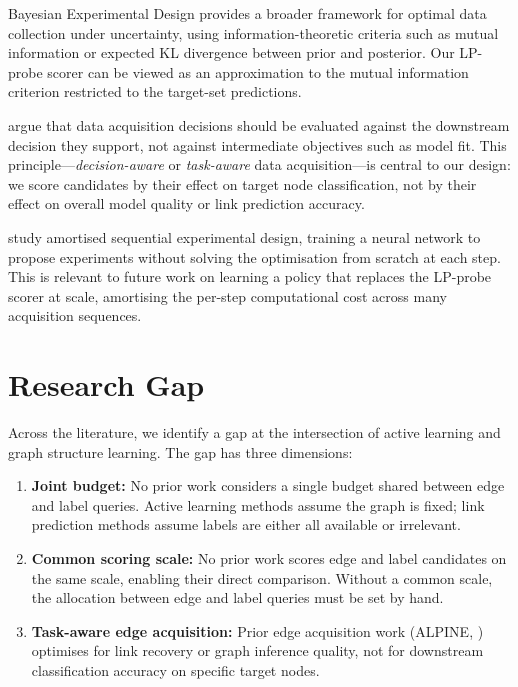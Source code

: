 \documentclass[12pt,a4paper,oneside]{report}
\begin{document}
Bayesian Experimental Design \citep{bed} provides a broader framework for optimal data collection under uncertainty, using information-theoretic criteria such as mutual information or expected KL divergence between prior and posterior. Our LP-probe scorer can be viewed as an approximation to the mutual information criterion restricted to the target-set predictions.

\citet{wilder} argue that data acquisition decisions should be evaluated against the downstream decision they support, not against intermediate objectives such as model fit. This principle---\emph{decision-aware} or \emph{task-aware} data acquisition---is central to our design: we score candidates by their effect on target node classification, not by their effect on overall model quality or link prediction accuracy.

\citet{foster} study amortised sequential experimental design, training a neural network to propose experiments without solving the optimisation from scratch at each step. This is relevant to future work on learning a policy that replaces the LP-probe scorer at scale, amortising the per-step computational cost across many acquisition sequences.

\section{Research Gap}

Across the literature, we identify a gap at the intersection of active learning and graph structure learning. The gap has three dimensions:

\begin{enumerate}[leftmargin=2em]
    \item \textbf{Joint budget:} No prior work considers a single budget shared between edge and label queries. Active learning methods assume the graph is fixed; link prediction methods assume labels are either all available or irrelevant.
    \item \textbf{Common scoring scale:} No prior work scores edge and label candidates on the same scale, enabling their direct comparison. Without a common scale, the allocation between edge and label queries must be set by hand.
    \item \textbf{Task-aware edge acquisition:} Prior edge acquisition work (ALPINE, \citealt{scout}) optimises for link recovery or graph inference quality, not for downstream classification accuracy on specific target nodes.
\end{enumerate}
\end{document}
